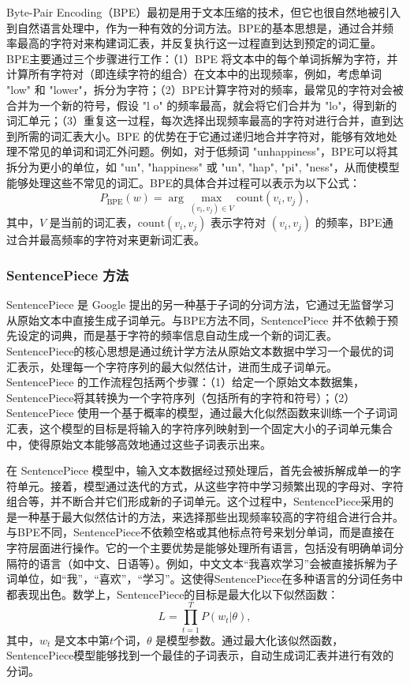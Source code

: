 Byte-Pair Encoding（BPE）最初是用于文本压缩的技术，但它也很自然地被引入到自然语言处理中，作为一种有效的分词方法。BPE的基本思想是，通过合并频率最高的字符对来构建词汇表，并反复执行这一过程直到达到预定的词汇量。BPE主要通过三个步骤进行工作：（1）BPE 将文本中的每个单词拆解为字符，并计算所有字符对（即连续字符的组合）在文本中的出现频率，例如，考虑单词 "low" 和 "lower"，拆分为字符；（2）BPE计算字符对的频率，最常见的字符对会被合并为一个新的符号，假设 "l o" 的频率最高，就会将它们合并为 "lo"，得到新的词汇单元；（3）重复这一过程，每次选择出现频率最高的字符对进行合并，直到达到所需的词汇表大小。BPE 的优势在于它通过递归地合并字符对，能够有效地处理不常见的单词和词汇外问题。例如，对于低频词 "unhappiness"，BPE可以将其拆分为更小的单位，如 "un", "happiness" 或 "un", "hap", "pi", "ness"，从而使模型能够处理这些不常见的词汇。BPE的具体合并过程可以表示为以下公式：
\begin{equation}
    P_{\text{BPE}}(w) = \arg\max_{(v_i, v_j) \in V} \text{count}(v_i, v_j),
\end{equation}
其中，$V$ 是当前的词汇表，$\text{count}(v_i, v_j)$ 表示字符对 $(v_i, v_j)$ 的频率，BPE通过合并最高频率的字符对来更新词汇表。

\subsubsection{SentencePiece 方法}

SentencePiece 是 Google 提出的另一种基于子词的分词方法，它通过无监督学习从原始文本中直接生成子词单元。与BPE方法不同，SentencePiece 并不依赖于预先设定的词典，而是基于字符的频率信息自动生成一个新的词汇表。SentencePiece的核心思想是通过统计学方法从原始文本数据中学习一个最优的词汇表示，处理每一个字符序列的最大似然估计，进而生成子词单元。SentencePiece 的工作流程包括两个步骤：（1）给定一个原始文本数据集，SentencePiece将其转换为一个字符序列（包括所有的字符和符号）；（2）SentencePiece 使用一个基于概率的模型，通过最大化似然函数来训练一个子词词汇表，这个模型的目标是将输入的字符序列映射到一个固定大小的子词单元集合中，使得原始文本能够高效地通过这些子词表示出来。

在 SentencePiece 模型中，输入文本数据经过预处理后，首先会被拆解成单一的字符单元。接着，模型通过迭代的方式，从这些字符中学习频繁出现的字母对、字符组合等，并不断合并它们形成新的子词单元。这个过程中，SentencePiece采用的是一种基于最大似然估计的方法，来选择那些出现频率较高的字符组合进行合并。与BPE不同，SentencePiece不依赖空格或其他标点符号来划分单词，而是直接在字符层面进行操作。它的一个主要优势是能够处理所有语言，包括没有明确单词分隔符的语言（如中文、日语等）。例如，中文文本“我喜欢学习”会被直接拆解为子词单位，如“我”，“喜欢”，“学习”。这使得SentencePiece在多种语言的分词任务中都表现出色。数学上，SentencePiece的目标是最大化以下似然函数：
\begin{equation}
    L = \prod_{t=1}^{T} P(w_t | \theta),
\end{equation}
其中，$w_t$ 是文本中第$t$个词，$\theta$ 是模型参数。通过最大化该似然函数，SentencePiece模型能够找到一个最佳的子词表示，自动生成词汇表并进行有效的分词。

